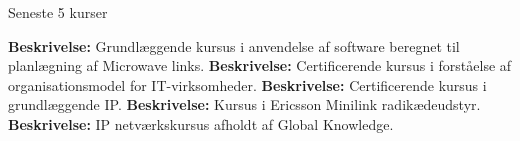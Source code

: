 ﻿\begin{rubric}{Seneste 5 kurser}

%
\entry*[dec 2012] \textbf{Beskrivelse:} Grundlæggende kursus i anvendelse af software beregnet til planlægning af Microwave links.
%
\entry*[okt 2012] \textbf{Beskrivelse:} Certificerende kursus i forståelse af organisationsmodel for IT-virksomheder.
%
\entry*[nov 2010] \textbf{Beskrivelse:} Certificerende kursus i grundlæggende IP.
%
\entry*[sep 2009] \textbf{Beskrivelse:} Kursus i Ericsson Minilink radikædeudstyr.
%
\entry*[jun 2009] \textbf{Beskrivelse:} IP netværkskursus afholdt af Global Knowledge. 
\end{rubric}
